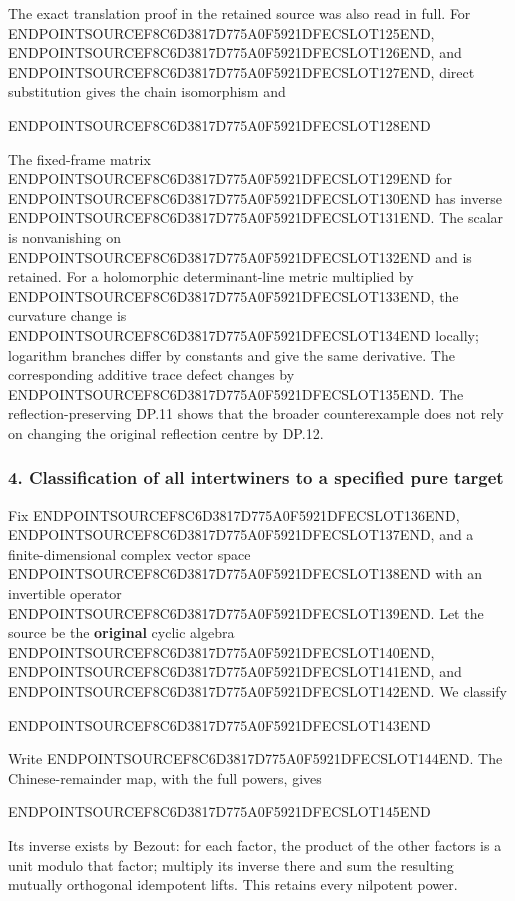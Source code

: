 The exact translation proof in the retained source was also read in full. For ENDPOINTSOURCEF8C6D3817D775A0F5921DFECSLOT125END, ENDPOINTSOURCEF8C6D3817D775A0F5921DFECSLOT126END, and ENDPOINTSOURCEF8C6D3817D775A0F5921DFECSLOT127END, direct substitution gives the chain isomorphism and

ENDPOINTSOURCEF8C6D3817D775A0F5921DFECSLOT128END

The fixed-frame matrix ENDPOINTSOURCEF8C6D3817D775A0F5921DFECSLOT129END for ENDPOINTSOURCEF8C6D3817D775A0F5921DFECSLOT130END has inverse ENDPOINTSOURCEF8C6D3817D775A0F5921DFECSLOT131END. The scalar is nonvanishing on ENDPOINTSOURCEF8C6D3817D775A0F5921DFECSLOT132END and is retained. For a holomorphic determinant-line metric multiplied by ENDPOINTSOURCEF8C6D3817D775A0F5921DFECSLOT133END, the curvature change is ENDPOINTSOURCEF8C6D3817D775A0F5921DFECSLOT134END locally; logarithm branches differ by constants and give the same derivative. The corresponding additive trace defect changes by ENDPOINTSOURCEF8C6D3817D775A0F5921DFECSLOT135END. The reflection-preserving DP.11 shows that the broader counterexample does not rely on changing the original reflection centre by DP.12.

\subsubsection{4. Classification of all intertwiners to a specified pure target}\label{endpoint-purity_review--classification-of-all-intertwiners-to-a-specified-pure-target}

Fix ENDPOINTSOURCEF8C6D3817D775A0F5921DFECSLOT136END, ENDPOINTSOURCEF8C6D3817D775A0F5921DFECSLOT137END, and a finite-dimensional complex vector space ENDPOINTSOURCEF8C6D3817D775A0F5921DFECSLOT138END with an invertible operator ENDPOINTSOURCEF8C6D3817D775A0F5921DFECSLOT139END. Let the source be the \textbf{original} cyclic algebra ENDPOINTSOURCEF8C6D3817D775A0F5921DFECSLOT140END, ENDPOINTSOURCEF8C6D3817D775A0F5921DFECSLOT141END, and ENDPOINTSOURCEF8C6D3817D775A0F5921DFECSLOT142END. We classify

ENDPOINTSOURCEF8C6D3817D775A0F5921DFECSLOT143END

Write ENDPOINTSOURCEF8C6D3817D775A0F5921DFECSLOT144END. The Chinese-remainder map, with the full powers, gives

ENDPOINTSOURCEF8C6D3817D775A0F5921DFECSLOT145END

Its inverse exists by Bezout: for each factor, the product of the other factors is a unit modulo that factor; multiply its inverse there and sum the resulting mutually orthogonal idempotent lifts. This retains every nilpotent power.

